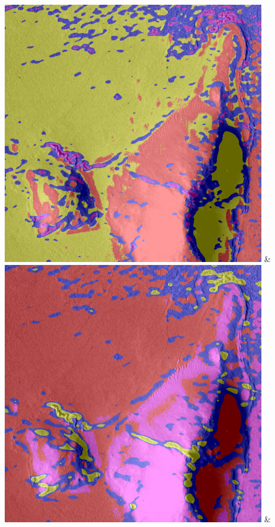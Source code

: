 \begin{table}[h!]
\begin{tabularx}{\textwidth}
		\includegraphics[width=0.9\linewidth]{images/gen/filter_size/p03_04.png_0.75.png} &
		\includegraphics[width=0.9\linewidth]{images/gen/filter_size/p03_04.png_1.00.png} &

\end{tabularx}
\end{table}
